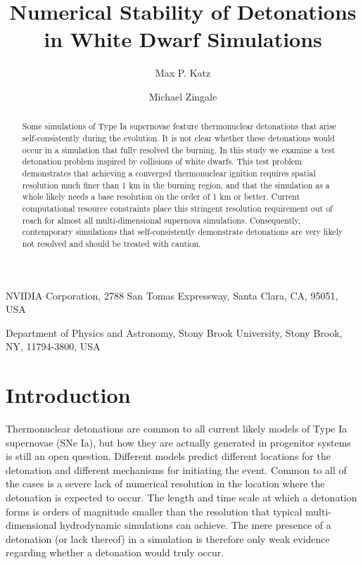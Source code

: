 \documentclass[twocolumn,numberedappendix]{../aastex62}
\begin{document}
\title{Numerical Stability of Detonations in White Dwarf Simulations}


\author{Max P. Katz}
\affiliation
{
  NVIDIA Corporation, 2788 San Tomas Expressway, Santa Clara, CA, 95051, USA
}

\author{Michael Zingale}
\affiliation
{
  Department of Physics and Astronomy, Stony Brook University, Stony Brook, NY, 11794-3800, USA
}



\begin{abstract}
Some simulations of Type Ia supernovae feature thermonuclear detonations that
arise self-consistently during the evolution. It is not clear whether these
detonations would occur in a simulation that fully resolved the burning. In this
study we examine a test detonation problem inspired by collisions of white dwarfs.
This test problem demonstrates that achieving a converged thermonuclear ignition
requires spatial resolution much finer than 1 km in the burning region, and that
the simulation as a whole likely needs a base resolution on the order of 1 km or better.
Current computational resource constraints place this stringent resolution requirement
out of reach for almost all multi-dimensional supernova simulations.
Consequently, contemporary simulations that self-consistently demonstrate
detonations are very likely not resolved and should be treated with caution.
\end{abstract}

\section{Introduction}
\label{sec:introduction}

Thermonuclear detonations are common to all current likely models of Type Ia
supernovae (SNe Ia), but how they are actually generated in progenitor systems
is still an open question. Different models predict different locations for
the detonation and different mechanisms for initiating the event. Common to all
of the cases is a severe lack of numerical resolution in the location where the
detonation is expected to occur. The length and time scale at which a detonation
forms is orders of magnitude smaller than the resolution that typical multi-dimensional
hydrodynamic simulations can achieve. The mere presence of a detonation (or lack thereof)
in a simulation is therefore only weak evidence regarding whether a detonation would truly occur.
\end{document}
